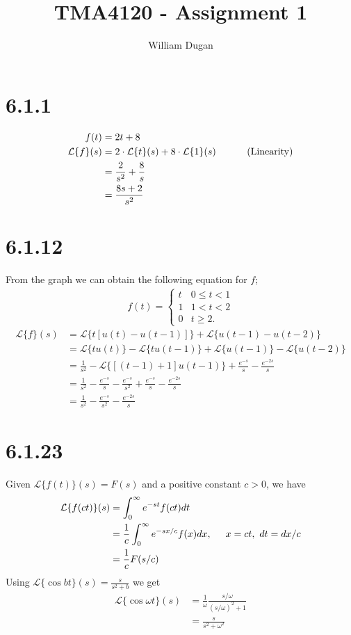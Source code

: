 \documentclass[11pt,a4paper]{article}
\newcommand{\Laplace}{\mathcal{L}}
\begin{document}
\title{TMA4120 - Assignment 1} 
\author{William Dugan}

\maketitle

\section*{6.1.1}
\begin{align*}
	f(t) &= 2t + 8 \\
	\Laplace\{f\}(s) &= 2 \cdot \Laplace\{t\}(s) + 8 \cdot \Laplace\{1\}(s) 
		\hspace*{1cm} \text{ (Linearity)} \\
	&= \frac{2}{s^2} + \frac{8}{s} \\
	&= \frac{8s + 2}{s^2}
\end{align*}

\section*{6.1.12}
From the graph we can obtain the following equation for $f$;
\begin{align*}
	f(t) = 
	\left\{\begin{matrix}
	t & 0 \leq t < 1 \\ 
	1 & 1 < t < 2 \\ 
	0 & t \ge 2.
	\end{matrix}\right.
\end{align*}
\begin{align*}
	\Laplace\{f\}(s) 
	&= \Laplace\{t [u(t) - u(t-1)]\} + \Laplace\{u(t-1) - u(t-2)\} \\
	&= \Laplace\{tu(t)\} - \Laplace\{tu(t-1)\} + \Laplace\{u(t-1)\} - \Laplace\{u(t-2)\} \\
	&= \frac{1}{s^2} - \Laplace\{[(t-1)+1]u(t-1)\} + \frac{e^{-s}}{s} - \frac{e^{-2s}}{s} \\
	&= \frac{1}{s^2} - \frac{e^{-s}}{s} - \frac{e^{-s}}{s^2} + \frac{e^{-s}}{s} - \frac{e^{-2s}}{s} \\
	&= \frac{1}{s^2} - \frac{e^{-s}}{s^2} - \frac{e^{-2s}}{s}
\end{align*}

\section*{6.1.23}
Given $\Laplace\{f(t)\}(s) = F(s)$ and a positive constant $c > 0$, we have
\begin{align*}
	\Laplace\{f(ct)\}(s)
	&= \int_0^{\infty} e^{-st}f(ct)dt \\
	&= \frac{1}{c} \int_0^{\infty} e^{-sx/c}f(x)dx, \hspace*{.5cm} x=ct,\ dt = dx/c\\
	&= \frac{1}{c} F(s/c)
\end{align*}
Using $\Laplace\{\cos bt\}(s) = \frac{s}{s^2 + b}$ we get
\begin{align*}
	\Laplace\{\cos\omega t\}(s) 
	&= \frac{1}{\omega} \frac{s/\omega}{(s/\omega)^2 + 1} \\
	&= \frac{s}{s^2 + \omega^2}
\end{align*}
\end{document}
